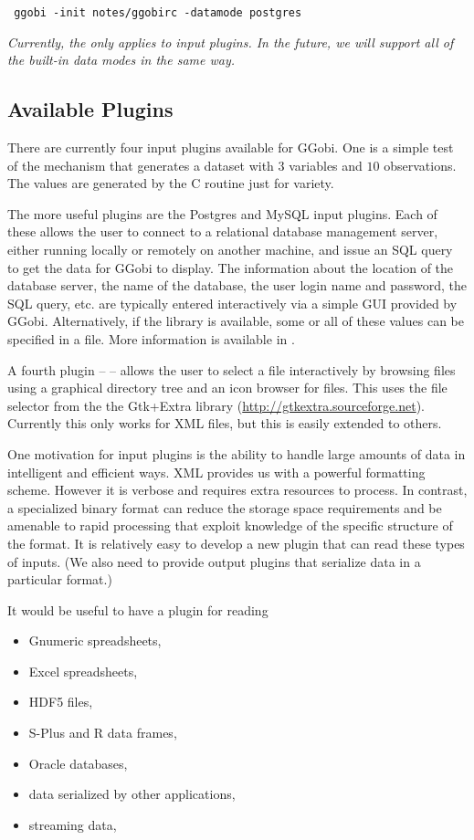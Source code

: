 \documentclass{article}
\def\file#1{\href{#1}{\Escape{#1}}}
\begin{document}
\begin{verbatim}
 ggobi -init notes/ggobirc -datamode postgres
\end{verbatim}

\textit{Currently, the  only applies to input plugins.
In the future, we will support all of the built-in data modes in the
same way.}


\subsection{Available Plugins}
There are currently four input plugins available for GGobi.  One is a
simple test of the mechanism that generates a dataset with $3$
variables and $10$ observations.  The values are generated by the C
routine  just for variety.

The more useful plugins are the Postgres and MySQL input plugins.
Each of these allows the user to connect to a relational database
management server, either running locally or remotely on another
machine, and issue an SQL query to get the data for GGobi to display.
The information about the location of the database server, the name of
the database, the user login name and password, the SQL query, etc.
are typically entered interactively via a simple GUI provided by
GGobi.  Alternatively, if the  library is
available, some or all of these values can be specified in a file.
More information is available in \file{DBMS.pdf}.

A fourth plugin --  -- allows the user to select a
file interactively by browsing files using a graphical directory tree
and an icon browser for files.  This uses the file selector from the
the Gtk+Extra library (\url{http://gtkextra.sourceforge.net}).
Currently this only works for XML files, but this is easily extended
to others.

One motivation for input plugins is the ability to handle large
amounts of data in intelligent and efficient ways.  XML provides us
with a powerful formatting scheme.  However it is verbose and requires
extra resources to process. In contrast, a specialized binary format
can reduce the storage space requirements and be amenable to rapid
processing that exploit knowledge of the specific structure of the
format. It is relatively easy to develop a new plugin that can read
these types of inputs.  (We also need to provide output plugins that
serialize data in a particular format.)


It would be useful to have a plugin for reading 
\begin{itemize}
\item Gnumeric spreadsheets,
\item Excel spreadsheets,
\item HDF5 files,
\item S-Plus and R data frames,
\item Oracle databases,
\item data serialized by other applications,
\item streaming data,
\end{itemize}
\end{document}
